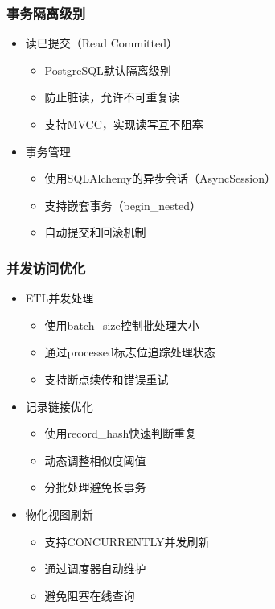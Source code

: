   \subsubsection{事务隔离级别}
  \begin{itemize}
    \item 读已提交（Read Committed）
    \begin{itemize}
      \item PostgreSQL默认隔离级别
      \item 防止脏读，允许不可重复读
      \item 支持MVCC，实现读写互不阻塞
    \end{itemize}
    \item 事务管理
    \begin{itemize}
      \item 使用SQLAlchemy的异步会话（AsyncSession）
      \item 支持嵌套事务（begin\_nested）
      \item 自动提交和回滚机制
    \end{itemize}
  \end{itemize}
  
  \subsubsection{并发访问优化}
  \begin{itemize}
    \item ETL并发处理
    \begin{itemize}
      \item 使用batch\_size控制批处理大小
      \item 通过processed标志位追踪处理状态
      \item 支持断点续传和错误重试
    \end{itemize}
    \item 记录链接优化
    \begin{itemize}
      \item 使用record\_hash快速判断重复
      \item 动态调整相似度阈值
      \item 分批处理避免长事务
    \end{itemize}
    \item 物化视图刷新
    \begin{itemize}
      \item 支持CONCURRENTLY并发刷新
      \item 通过调度器自动维护
      \item 避免阻塞在线查询
    \end{itemize}
  \end{itemize}


